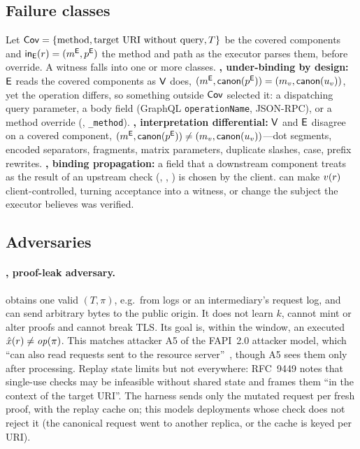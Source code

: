 \subsection{Failure classes}\label{sec:model:classes}

Let $\mathsf{Cov}=\{\text{method},\text{target URI without query},T\}$ be the covered
components and $\mathsf{in}_{\mathsf{E}}(r)=(m^{\mathsf{E}},p^{\mathsf{E}})$ the method and path as
the executor parses them, before override. A witness falls into one or more
classes.
\textbf{\GA, under-binding by design:} $\mathsf{E}$ reads the covered components as
$\mathsf{V}$ does, $(m^{\mathsf{E}},\mathsf{canon}(p^{\mathsf{E}}))=(m_v,\mathsf{canon}(u_v))$, yet the operation
differs, so something outside $\mathsf{Cov}$ selected it: a dispatching query
parameter, a body field (GraphQL \texttt{operationName}, JSON-RPC), or a
method override (, \texttt{\_method}).
\textbf{\GB, interpretation differential:} $\mathsf{V}$ and $\mathsf{E}$ disagree on a
covered component, $(m^{\mathsf{E}},\mathsf{canon}(p^{\mathsf{E}}))\neq(m_v,\mathsf{canon}(u_v))$---dot
segments, encoded separators, fragments, matrix parameters, duplicate slashes,
case, prefix rewrites.
\textbf{\GC, binding propagation:} a field that a downstream component treats
as the result of an upstream check (,
, ) is chosen by the client. \GC can make
$v(r)$ client-controlled, turning acceptance into a \GB witness, or change
the subject the executor believes was verified.

\subsection{Adversaries}\label{sec:model:adversaries}

\paragraph{\Aleak, proof-leak adversary.} \Aleak obtains one valid
$(T,\pi)$, e.g.\ from logs or an intermediary's request log, and can send
arbitrary bytes to the public origin. It does not learn $k$, cannot mint or
alter proofs and cannot break TLS. Its goal is, within the \iat window, an
executed $\hat{x}(r)\neq\mathit{op}(\pi)$. This matches attacker A5 of the FAPI~2.0
attacker model, which ``can also read requests sent to the resource
server''~\cite{fapiam2025}, though A5 sees them only after processing. Replay
state limits \Aleak but not everywhere: RFC~9449 notes that single-use \jti
checks may be infeasible without shared state and frames them ``in the
context of the target URI''. The harness sends only the mutated request per
fresh proof, with the replay cache on; this models deployments whose \jti
check does not reject it (the canonical request went to another replica, or
the cache is keyed per URI).


